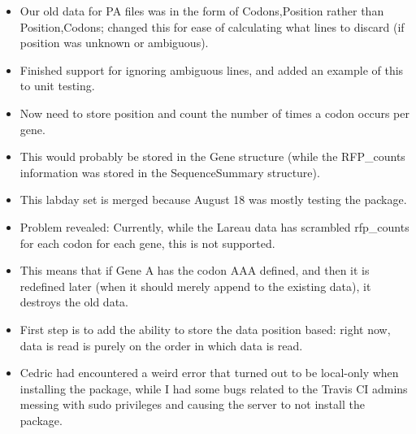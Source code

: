 \documentclass[12pt,hyperref]{labbook}
\begin{document}

\begin{itemize}
    \item Our old data for PA files was in the form of Codons,Position rather than Position,Codons; changed this for ease of calculating what lines to discard (if position was unknown or ambiguous).
    \item Finished support for ignoring ambiguous lines, and added an example of this to unit testing.
\end{itemize}


\begin{itemize}
    \item Now need to store position and count the number of times a codon occurs per gene.
    \item This would probably be stored in the Gene structure (while the RFP\_counts information was stored in the SequenceSummary structure).
\end{itemize}


\begin{itemize}
    \item This labday set is merged because August 18 was mostly testing the package.
    \item Problem revealed: Currently, while the Lareau data has scrambled rfp\_counts for each codon for each gene, this is not supported.
    \item This means that if Gene A has the codon AAA defined, and then it is redefined later (when it should merely append to the existing data), it destroys the old data.
    \item First step is to add the ability to store the data position based: right now, data is read is purely on the order in which data is read.
    \item Cedric had encountered a weird error that turned out to be local-only when installing the package, while I had some bugs related to the Travis CI admins messing with sudo privileges and causing the server to not install the package.
\end{itemize}

\end{document}
